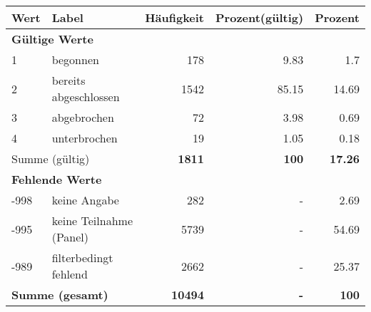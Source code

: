      \begin{longtable}{lXrrr}
     \toprule
     \textbf{Wert} & \textbf{Label} & \textbf{Häufigkeit} & \textbf{Prozent(gültig)} & \textbf{Prozent} \\
     \endhead
     \midrule
     \multicolumn{5}{l}{\textbf{Gültige Werte}}\\

     1 &
     \multicolumn{1}{X}{ begonnen   } &


       \num{178} &
       \num[round-mode=places,round-precision=2]{9.83} &
         \num[round-mode=places,round-precision=2]{1.7} \\

     2 &
     \multicolumn{1}{X}{ bereits abgeschlossen   } &


       \num{1542} &
       \num[round-mode=places,round-precision=2]{85.15} &
         \num[round-mode=places,round-precision=2]{14.69} \\

     3 &
     \multicolumn{1}{X}{ abgebrochen   } &


       \num{72} &
       \num[round-mode=places,round-precision=2]{3.98} &
         \num[round-mode=places,round-precision=2]{0.69} \\

     4 &
     \multicolumn{1}{X}{ unterbrochen   } &


       \num{19} &
       \num[round-mode=places,round-precision=2]{1.05} &
         \num[round-mode=places,round-precision=2]{0.18} \\
     \midrule
     \multicolumn{2}{l}{Summe (gültig)} &
       \textbf{\num{1811}} &
     \textbf{\num{100}} &
       \textbf{\num[round-mode=places,round-precision=2]{17.26}} \\
     \multicolumn{5}{l}{\textbf{Fehlende Werte}}\\
       -998 &
       keine Angabe &
         \num{282} &
        - &
         \num[round-mode=places,round-precision=2]{2.69} \\
       -995 &
       keine Teilnahme (Panel) &
         \num{5739} &
        - &
         \num[round-mode=places,round-precision=2]{54.69} \\
       -989 &
       filterbedingt fehlend &
         \num{2662} &
        - &
         \num[round-mode=places,round-precision=2]{25.37} \\
     \midrule
     \multicolumn{2}{l}{\textbf{Summe (gesamt)}} &
          \textbf{\num{10494}} &
        \textbf{-} &
        \textbf{\num{100}} \\
     \bottomrule
     \end{longtable}
     
